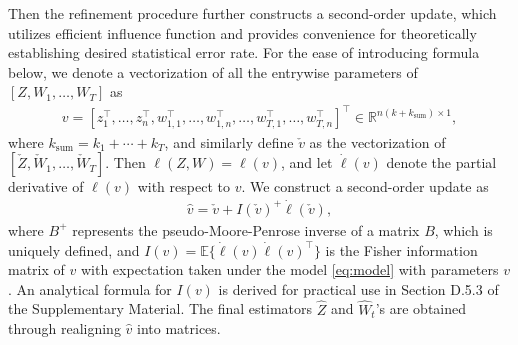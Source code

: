\documentclass[12pt]{article}
\newcommand{\EXPT}{\mathbb{E}}
\newcommand{\ksum}{k_{\operatorname{sum}}}
\begin{document}
Then the refinement procedure   further constructs a  second-order update, which  utilizes  efficient influence function
and provides convenience for   theoretically establishing desired  statistical error rate. 
For the ease of introducing formula below, we denote a vectorization of all the entrywise parameters of $[Z, W_1,\ldots ,W_T]$  as   
\begin{align}\label{eq:vectorization}
    v= \left[z_1^{\top},\ldots, z_n^{\top},w_{1,1}^{\top},\ldots, w_{1,n}^{\top},\ldots, w_{T,1}^{\top},\ldots, w_{T,n}^{\top}\right]^{\top}  \in \mathbb{R}^{ n(k+\ksum )\times 1},  
\end{align}
where $\ksum=k_1+\cdots+k_T$, 
and similarly define $\check{v}$ as the vectorization of $[\check{Z},\check{W}_1,\ldots, \check{W}_T]$.  
Then $\ell(Z,W)=\ell(v)$, and let  $\dot{\ell}(v)$ denote the partial derivative of $\ell(v)$ with respect to $v$.
We construct a second-order update as 
\begin{align} \label{eq:newtononev}
    \hat{v} = \check{v} + I(\check{v})^{+}\dot{\ell}(\check{v}), 
\end{align}
where $B^{+}$ represents the pseudo-Moore-Penrose inverse of a matrix $B$, which is uniquely defined, and 
$ I(v)=\EXPT\{ \dot{\ell}(v) \dot{\ell}(v)^{\top}\} $  is the Fisher information matrix of $v$ with   expectation taken under the model \eqref{eq:model} with parameters $v$. An analytical formula for $I(v)$  is derived for practical use in Section D.5.3 of the Supplementary Material.
The final estimators $\hat{Z}$ and $\hat{W}_t$'s are obtained through realigning $\hat{v}$ into matrices. 
\end{document}
